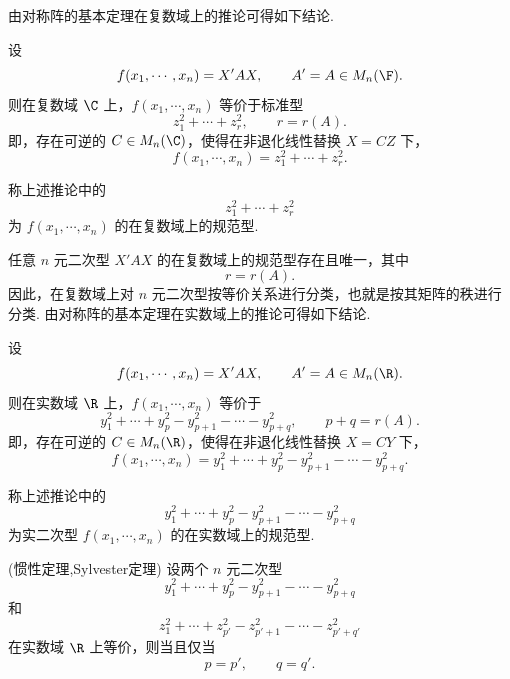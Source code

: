 由对称阵的基本定理在复数域上的推论可得如下结论.

\begin{corollary}
	设
	\[
	f(x_1,\cdots,x_n)=X'AX,
	\qquad A'=A\in M_n(\F).
	\]
	则在复数域 $\C$ 上，$f(x_1,\cdots,x_n)$ 等价于标准型
	\[
	z_1^2+\cdots+z_r^2,
	\qquad r=r(A).
	\]
	即，存在可逆的 $C\in M_n(\C)$，使得在非退化线性替换 $X=CZ$ 下，
	\[
	f(x_1,\cdots,x_n)=z_1^2+\cdots+z_r^2.
	\]
\end{corollary}

\begin{definition}
	称上述推论中的
	\[
	z_1^2+\cdots+z_r^2
	\]
	为 $f(x_1,\cdots,x_n)$ 的在复数域上的规范型.
\end{definition}任意 $n$ 元二次型 $X'AX$ 的在复数域上的规范型存在且唯一，其中\[r=r(A).\]因此，在复数域上对 $n$ 元二次型按等价关系进行分类，也就是按其矩阵的秩进行分类.
由对称阵的基本定理在实数域上的推论可得如下结论.

\begin{corollary}
	设
	\[
	f(x_1,\cdots,x_n)=X'AX,
	\qquad A'=A\in M_n(\R).
	\]
	则在实数域 $\R$ 上，$f(x_1,\cdots,x_n)$ 等价于
	\[
	y_1^2+\cdots+y_p^2-y_{p+1}^2-\cdots-y_{p+q}^2,
	\qquad p+q=r(A).
	\]
	即，存在可逆的 $C\in M_n(\R)$，使得在非退化线性替换 $X=CY$ 下，
	\[
	f(x_1,\cdots,x_n)=y_1^2+\cdots+y_p^2-y_{p+1}^2-\cdots-y_{p+q}^2.
	\]
\end{corollary}

\begin{definition}
	称上述推论中的
	\[
	y_1^2+\cdots+y_p^2-y_{p+1}^2-\cdots-y_{p+q}^2
	\]
	为实二次型 $f(x_1,\cdots,x_n)$ 的在实数域上的规范型.
\end{definition}



\begin{theorem}(惯性定理,Sylvester定理)
	设两个 $n$ 元二次型
	\[
	y_1^2+\cdots+y_p^2-y_{p+1}^2-\cdots-y_{p+q}^2
	\]
	和
	\[
	z_1^2+\cdots+z_{p'}^2-z_{p'+1}^2-\cdots-z_{p'+q'}^2
	\]
	在实数域 $\R$ 上等价，则当且仅当
	\[
	p=p',\qquad q=q'.
	\]
\end{theorem}

